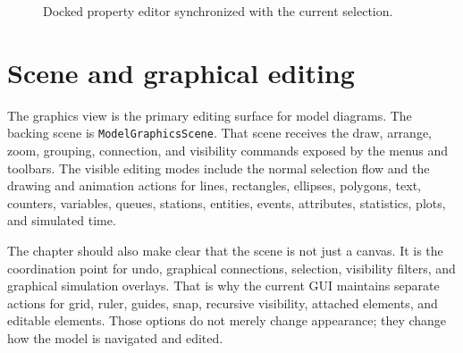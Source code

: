 \begin{figure}[htbp]
\centering
{}
\caption{Docked property editor synchronized with the current selection.}
\label{fig:main-graphical-property-editor}
\end{figure}

\section{Scene and graphical editing}
\label{sec:main-graphical-application-scene}

The graphics view is the primary editing surface for model diagrams.
The backing scene is \texttt{ModelGraphicsScene}.
That scene receives the draw, arrange, zoom, grouping, connection, and
visibility commands exposed by the menus and toolbars. The visible editing
modes include the normal selection flow and the drawing and animation actions
for lines, rectangles, ellipses, polygons, text, counters, variables, queues,
stations, entities, events, attributes, statistics, plots, and simulated
time.

The chapter should also make clear that the scene is not just a canvas. It is
the coordination point for undo, graphical connections, selection, visibility
filters, and graphical simulation overlays. That is why the current GUI
maintains separate actions for grid, ruler, guides, snap, recursive visibility,
attached elements, and editable elements. Those options do not merely change
appearance; they change how the model is navigated and edited.

